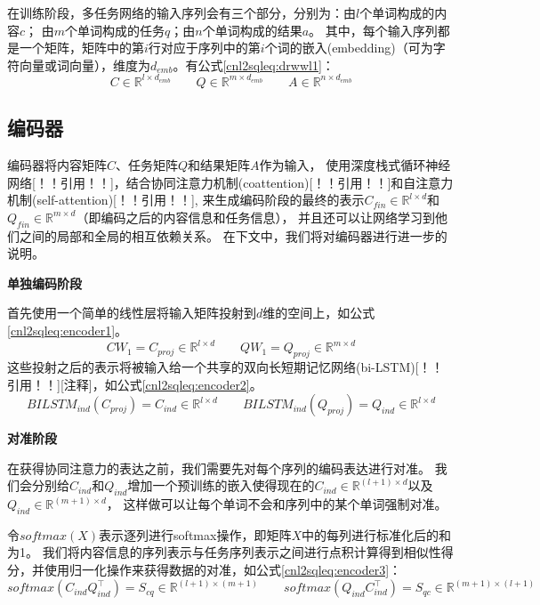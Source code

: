 在训练阶段，多任务网络的输入序列会有三个部分，分别为：由$l$个单词构成的内容$c$；
由$m$个单词构成的任务$q$；由$n$个单词构成的结果$a$。
其中，每个输入序列都是一个矩阵，矩阵中的第$i$行对应于序列中的第$i$个词的嵌入(embedding)（可为字符向量或词向量），维度为$d_{emb}$。有公式\ref{cnl2sqleq:drwwl1}：
\begin{equation}
    \label{cnl2sqleq:drwwl1}
    C \in \mathbb{R}^{l \times d_{emb}} \qquad Q \in \mathbb{R}^{m \times d_{emb}} \qquad A \in \mathbb{R}^{n \times d_{emb}}
  \end{equation}

\subsection{编码器}
\label{cnl2sql:encoder}

编码器将内容矩阵$C$、任务矩阵$Q$和结果矩阵$A$作为输入，
使用深度栈式循环神经网络[！！引用！！]，结合协同注意力机制(coattention)[！！引用！！]和自注意力机制(self-attention)[！！引用！！],
来生成编码阶段的最终的表示$C_{fin} \in \mathbb{R}^{l \times d}$和$Q_{fin} \in \mathbb{R}^{m \times d}$（即编码之后的内容信息和任务信息），
并且还可以让网络学习到他们之间的局部和全局的相互依赖关系。
在下文中，我们将对编码器进行进一步的说明。

\textbf{单独编码阶段}

首先使用一个简单的线性层将输入矩阵投射到$d$维的空间上，如公式\ref{cnl2sqleq:encoder1}。
\begin{equation}
    \label{cnl2sqleq:encoder1}
    CW_1 = C_{proj} \in \mathbb{R}^{l \times d} \qquad QW_1 = Q_{proj} \in \mathbb{R}^{m \times d} 
  \end{equation}
这些投射之后的表示将被输入给一个共享的双向长短期记忆网络(bi-LSTM)[！！引用！！][注释]，如公式\ref{cnl2sqleq:encoder2}。
\begin{equation}
    \label{cnl2sqleq:encoder2}
    BILSTM_{ind}(C_{proj}) = C_{ind} \in \mathbb{R}^{l \times d} \qquad BILSTM_{ind}(Q_{proj}) = Q_{ind} \in \mathbb{R}^{l \times d}
\end{equation}

\textbf{对准阶段}

在获得协同注意力的表达之前，我们需要先对每个序列的编码表达进行对准。
我们会分别给$C_{ind}$和$Q_{ind}$增加一个预训练的嵌入使得现在的$C_{ind} \in \mathbb{R}^{(l+1) \times d}$以及$Q_{ind} \in \mathbb{R}^{(m+1) \times d}$，
这样做可以让每个单词不会和序列中的某个单词强制对准。

令$softmax(X)$表示逐列进行softmax操作，即矩阵$X$中的每列进行标准化后的和为1。
我们将内容信息的序列表示与任务序列表示之间进行点积计算得到相似性得分，并使用归一化操作来获得数据的对准，如公式\ref{cnl2sqleq:encoder3}：
\begin{equation}
  \label{cnl2sqleq:encoder3}
  softmax(C_{ind}Q_{ind}^{\top}) = S_{cq} \in \mathbb{R}^{(l+1) \times (m+1)} \qquad softmax(Q_{ind}C_{ind}^{\top}) = S_{qc} \in \mathbb{R}^{(m+1) \times (l+1)}
\end{equation}

